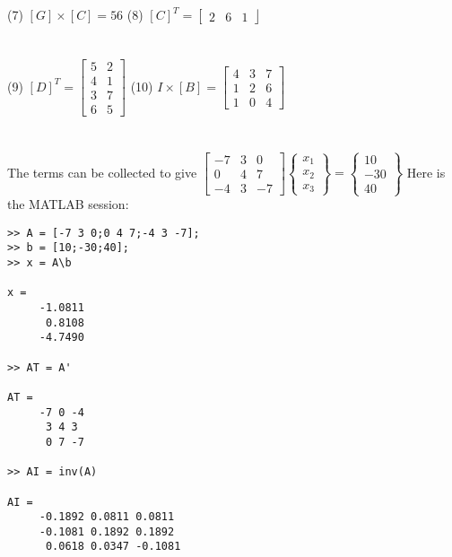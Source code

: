 \documentclass[../main.tex]{subfiles}
\begin{document}
\begin{enumerate}[label=\bfseries(\alph*)]
(7) $[G] \times[C]=56$\quad\quad\quad\quad\quad\quad\quad\quad\quad\quad
(8) $[C]^{T}=\left[\begin{array}{lll}2 & 6 & 1\end{array}\right\rfloor$\\\\\\
(9) $[D]^{T}=\left[\begin{array}{ll}5 & 2 \\ 4 & 1 \\ 3 & 7 \\ 6 & 5\end{array}\right]$\quad\quad\quad\quad\quad\quad\quad\quad
(10) $I \times[B]=\left[\begin{array}{lll}4 & 3 & 7 \\ 1 & 2 & 6 \\ 1 & 0 & 4\end{array}\right]$
\bigbreak
\section{}
The terms can be collected to give
\bigbreak
$\left[\begin{array}{ccc}
-7 & 3 & 0 \\
0 & 4 & 7 \\
-4 & 3 & -7
\end{array}\right]\left\{\begin{array}{l}
x_{1} \\
x_{2} \\
x_{3}
\end{array}\right\}=\left\{\begin{array}{c}
10 \\
-30 \\
40
\end{array}\right\}$
\bigbreak
Here is the MATLAB session:
\bigbreak
\begin{lstlisting}[numbers=none]
>> A = [-7 3 0;0 4 7;-4 3 -7];
>> b = [10;-30;40];
>> x = A\b

x =
 	 -1.0811
 	  0.8108
 	 -4.7490
 	
>> AT = A'

AT =
	 -7 0 -4
 	  3 4 3
 	  0 7 -7
 	 
>> AI = inv(A)

AI =
 	 -0.1892 0.0811 0.0811
 	 -0.1081 0.1892 0.1892
 	  0.0618 0.0347 -0.1081
\end{lstlisting}
\bigbreak


\end{enumerate}
\end{document}
